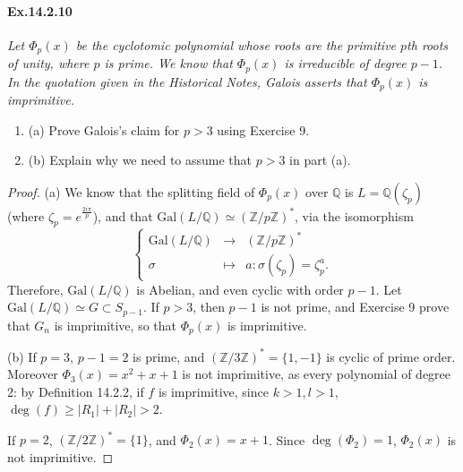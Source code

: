 \documentclass[11pt,a4paper]{article}
\newcommand{\be} {\begin{enumerate}}
\newcommand{\ee} {\end{enumerate}}
\newcommand{\Q}{\mathbb{Q}}
\newcommand{\Z}{\mathbb{Z}}
\newcommand{\Gal}{\mathrm{Gal}}
\begin{document}
\paragraph{Ex.14.2.10} {\it Let $\Phi_p(x)$ be the cyclotomic polynomial whose roots are the primitive $p$th roots of unity, where $p$ is prime. We know that $\Phi_p(x)$ is irreducible of degree $p-1$. In the quotation given in the Historical Notes, Galois asserts that $\Phi_p(x)$ is imprimitive.
\be
\item[(a)]
Prove Galois's claim for $p>3$ using Exercise 9.
\item[(b)] Explain why we need to assume that $p>3$ in part (a).
\ee
}

\begin{proof}
\item[(a)]
We know that the splitting field of $\Phi_p(x)$ over $\Q$ is $L = \Q(\zeta_p)$ (where $\zeta_p = e^{\frac{2i\pi}{p}}$), and that $\Gal(L/\Q) \simeq (\Z/p\Z)^*$, via the isomorphism 
$$
\left\{
\begin{array}{ccl}
\Gal(L/\Q) & \to & (\Z/p\Z)^*\\
\sigma & \mapsto & a : \sigma(\zeta_p) = \zeta_p^a.
\end{array}
\right.
$$
Therefore, $\Gal(L/\Q)$ is Abelian, and even cyclic with order $p-1$. Let $\Gal(L/\Q) \simeq G  \subset S_{p-1}$. If $p>3$, then $p-1$ is not prime, and Exercise 9 prove that  $G_n$ is imprimitive, so that $\Phi_p(x)$ is imprimitive.

\item[(b)] If $p = 3$, $p-1 = 2$ is prime, and $(\Z/3\Z)^* = \{1 ,-1 \}$ is cyclic of prime order. Moreover $\Phi_3(x) = x^2+x + 1$ is not imprimitive, as every polynomial of degree 2: by Definition 14.2.2, if $f$ is imprimitive, since $k>1,l>1$, $\deg(f) \geq |R_1|+|R_2| >2$.

If $p = 2$, $(\Z/2\Z)^* = \{1\}$, and $\Phi_2(x) = x+1$. Since $\deg(\Phi_2) = 1$, $\Phi_2(x)$  is not imprimitive.
 
\end{proof}
\end{document}
